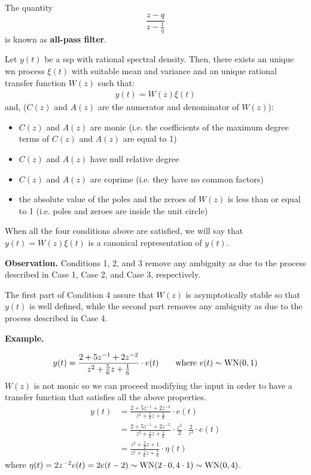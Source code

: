
The quantity
\[
	\frac{z-q}{z-\frac{1}{q}}
\]
is known as \textbf{all-pass filter}.

\begin{theorem}
	Let $y(t)$ be a \gls{ssp} with rational spectral density. 
	Then, there exists an unique \gls{wn} process $\xi(t)$ with suitable mean and variance and an unique rational transfer function $W(z)$ such that:
	\begin{align*}
		y(t) = W(z)\xi(t)
	\end{align*}
    and, ($C(z)$ and $A(z)$ are the numerator and denominator of $W(z)$):
    \begin{itemize}
		\item $C(z)$ and $A(z)$ are monic (i.e. the coefficients of the maximum degree terms of $C(z)$ and $A(z)$ are equal to 1)
		\item $C(z)$ and $A(z)$ have null relative degree
		\item $C(z)$ and $A(z)$ are coprime (i.e. they have no common factors) 
		\item the absolute value of the poles and the zeroes of $W(z)$ is less than or equal to 1 (i.e. poles and zeroes are inside the unit circle)
    \end{itemize}
\end{theorem}

When all the four conditions above are satisfied, we will say that $y(t) = W(z)\xi(t)$ is a canonical representation of $y(t)$.

\textbf{Observation.} Conditions 1, 2, and 3 remove any ambiguity as due to the process described in Case 1, Case 2, and Case 3, respectively. 

The first part of Condition 4 assure that $W(z)$ is asymptotically stable so that $y(t)$ is well defined, while the second part removes any ambiguity as due to the process described in Case 4.

\textbf{Example.}

\begin{align*}
	y(t)=\frac{2+5z^{-1}+2z^{-2}}{z^2+\frac{5}{6}z+\frac{1}{6}}\cdot e(t)  \qquad \text{where } e(t)\sim \operatorname{WN}(0,1)
\end{align*}
$W(z)$ is not monic so we can proceed modifying the input in order to have a transfer function that satisfies all the above properties.
\begin{align*}
	y(t)&=\frac{2+5z^{-1}+2z^{-2}}{z^2+\frac{5}{6}z+\frac{1}{6}}\cdot e(t) \\
	&=\frac{2+5z^{-1}+2z^{-2}}{z^2+\frac{5}{6}z+\frac{1}{6}}\cdot\frac{z^2}{2}\cdot\frac{2}{z^2}\cdot e(t)\\
	&=\frac{z^2+\frac{5}{2}z+1}{z^2+\frac{5}{6}z+\frac{1}{6}}\cdot \eta(t)
\end{align*}
where $\eta(t)=2z^{-2}e(t)=2e(t-2)\sim \operatorname{WN}(2\cdot0,4\cdot 1)\sim \operatorname{WN}(0,4)$.

